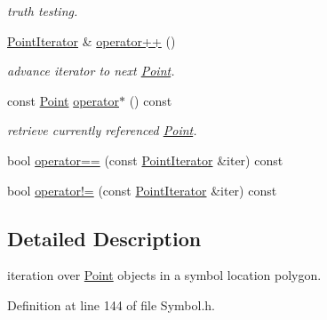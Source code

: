 \begin{DoxyCompactItemize}
\begin{DoxyCompactList}\small\item\em truth testing. \end{DoxyCompactList}\item 
\hypertarget{classzbar_1_1_symbol_1_1_point_iterator_aac750411b7aeaa00fb4aad4719a6c745}{
\hyperlink{classzbar_1_1_symbol_1_1_point_iterator}{PointIterator} \& \hyperlink{classzbar_1_1_symbol_1_1_point_iterator_aac750411b7aeaa00fb4aad4719a6c745}{operator++} ()}
\label{classzbar_1_1_symbol_1_1_point_iterator_aac750411b7aeaa00fb4aad4719a6c745}

\begin{DoxyCompactList}\small\item\em advance iterator to next \hyperlink{classzbar_1_1_symbol_1_1_point}{Point}. \end{DoxyCompactList}\item 
\hypertarget{classzbar_1_1_symbol_1_1_point_iterator_a8ff3f0c784f75c22fd014ad4d54ba2a5}{
const \hyperlink{classzbar_1_1_symbol_1_1_point}{Point} \hyperlink{classzbar_1_1_symbol_1_1_point_iterator_a8ff3f0c784f75c22fd014ad4d54ba2a5}{operator$\ast$} () const }
\label{classzbar_1_1_symbol_1_1_point_iterator_a8ff3f0c784f75c22fd014ad4d54ba2a5}

\begin{DoxyCompactList}\small\item\em retrieve currently referenced \hyperlink{classzbar_1_1_symbol_1_1_point}{Point}. \end{DoxyCompactList}\item 
bool \hyperlink{classzbar_1_1_symbol_1_1_point_iterator_a5cdf995226c0629036ce98c2f8c4479b}{operator==} (const \hyperlink{classzbar_1_1_symbol_1_1_point_iterator}{PointIterator} \&iter) const 
\item 
bool \hyperlink{classzbar_1_1_symbol_1_1_point_iterator_a6d051bfd9332c7f955a85d038888505c}{operator!=} (const \hyperlink{classzbar_1_1_symbol_1_1_point_iterator}{PointIterator} \&iter) const 
\end{DoxyCompactItemize}


\subsection{Detailed Description}
iteration over \hyperlink{classzbar_1_1_symbol_1_1_point}{Point} objects in a symbol location polygon. 

Definition at line 144 of file Symbol.h.



